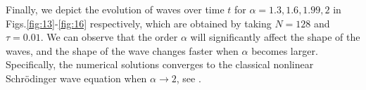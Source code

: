 \documentclass[preprint,compress,3p,10pt,fleqn]{elsarticle}
\numberwithin{equation}{section}
\newtheorem{remark}[theorem]{Remark}
\begin{document}
%

Finally, we depict the evolution of waves over time $t$ for $\alpha=1.3,1.6,1.99,2$ in Figs.\ref{fig:13}-\ref{fig:16} respectively, which are obtained by taking $N=128$ and $\tau=0.01$. We can observe that the order $\alpha$ will significantly affect the shape of the waves, and the shape of the wave changes faster when $\alpha$ becomes larger. Specifically, the numerical solutions converges to the classical nonlinear Schr{\"o}dinger wave equation when $\alpha \rightarrow 2$, see \cite{zhangConservativeNumericalScheme2003,liCompactFiniteDifference2012,wangAnalysisNewConservative2006}.
\end{document}
